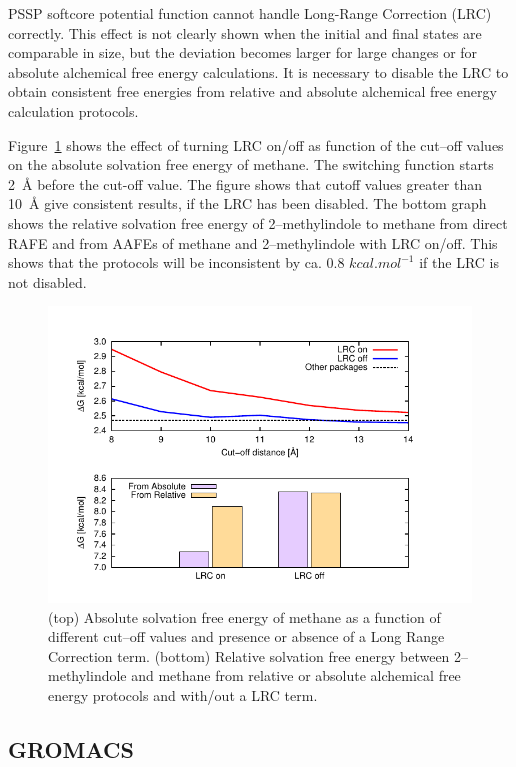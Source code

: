 \documentclass[journal=jctcce,manuscript=article]{achemso}
\begin{document}
PSSP softcore potential function cannot handle Long-Range Correction (LRC) correctly. This effect is not clearly shown when the initial and final states are comparable in size, but the deviation becomes larger for large changes or for absolute alchemical free energy calculations. It is necessary to disable the LRC to obtain consistent free energies from relative and absolute alchemical free energy calculation protocols.

Figure~\ref{fig:LRC} shows the effect of turning LRC on/off as function of the cut--off values on the absolute solvation free energy of methane. The switching function starts \SI{2}{\angstrom} before the cut-off value. The figure shows that cutoff values greater than \SI{10}{\angstrom} give consistent results, if the LRC has been disabled. The bottom graph shows the relative solvation
free energy of 2--methylindole to methane from direct RAFE and from AAFEs of methane and 2--methylindole with LRC on/off. This shows that the protocols will be inconsistent by ca. 0.8 $kcal.mol^{-1}$ if the LRC is not disabled.

\begin{figure}[ht]
\includegraphics[scale=1.0]{figures/LRC}
\caption{(top) Absolute solvation free energy of methane as a function of different cut--off values and presence or absence of a Long Range Correction term. (bottom) Relative solvation free energy between 2--methylindole and methane from relative or absolute alchemical free energy protocols and with/out a LRC term.}
\label{fig:LRC}
\end{figure}



\subsection{GROMACS}
\label{sec:gromacs-results}
\end{document}
